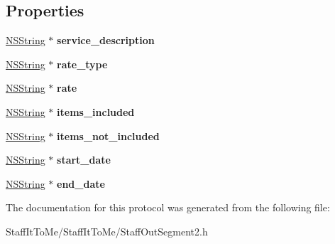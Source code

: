\subsection*{\-Properties}
\begin{DoxyCompactItemize}
\item 
\hypertarget{protocol_staff_out_segment2-p_a19edf94145cfdd0ce4890009994b0340}{
\hyperlink{class_n_s_string}{\-N\-S\-String} $\ast$ {\bfseries service\-\_\-description}}
\label{protocol_staff_out_segment2-p_a19edf94145cfdd0ce4890009994b0340}

\item 
\hypertarget{protocol_staff_out_segment2-p_a124046a0c607cae37871db484044c159}{
\hyperlink{class_n_s_string}{\-N\-S\-String} $\ast$ {\bfseries rate\-\_\-type}}
\label{protocol_staff_out_segment2-p_a124046a0c607cae37871db484044c159}

\item 
\hypertarget{protocol_staff_out_segment2-p_a02a81d64976baf753dc986014bbc570a}{
\hyperlink{class_n_s_string}{\-N\-S\-String} $\ast$ {\bfseries rate}}
\label{protocol_staff_out_segment2-p_a02a81d64976baf753dc986014bbc570a}

\item 
\hypertarget{protocol_staff_out_segment2-p_a5daff0c1c24085cd50535db101d0b84f}{
\hyperlink{class_n_s_string}{\-N\-S\-String} $\ast$ {\bfseries items\-\_\-included}}
\label{protocol_staff_out_segment2-p_a5daff0c1c24085cd50535db101d0b84f}

\item 
\hypertarget{protocol_staff_out_segment2-p_a0689959b02a5bd022721b2b26e089074}{
\hyperlink{class_n_s_string}{\-N\-S\-String} $\ast$ {\bfseries items\-\_\-not\-\_\-included}}
\label{protocol_staff_out_segment2-p_a0689959b02a5bd022721b2b26e089074}

\item 
\hypertarget{protocol_staff_out_segment2-p_ad03d6752e9ef6d1fb14fcad9ac6d75a8}{
\hyperlink{class_n_s_string}{\-N\-S\-String} $\ast$ {\bfseries start\-\_\-date}}
\label{protocol_staff_out_segment2-p_ad03d6752e9ef6d1fb14fcad9ac6d75a8}

\item 
\hypertarget{protocol_staff_out_segment2-p_a51933a319221f3ad5b3b5c524f0afad3}{
\hyperlink{class_n_s_string}{\-N\-S\-String} $\ast$ {\bfseries end\-\_\-date}}
\label{protocol_staff_out_segment2-p_a51933a319221f3ad5b3b5c524f0afad3}

\end{DoxyCompactItemize}


\-The documentation for this protocol was generated from the following file\-:\begin{DoxyCompactItemize}
\item 
\-Staff\-It\-To\-Me/\-Staff\-It\-To\-Me/\-Staff\-Out\-Segment2.\-h\end{DoxyCompactItemize}
